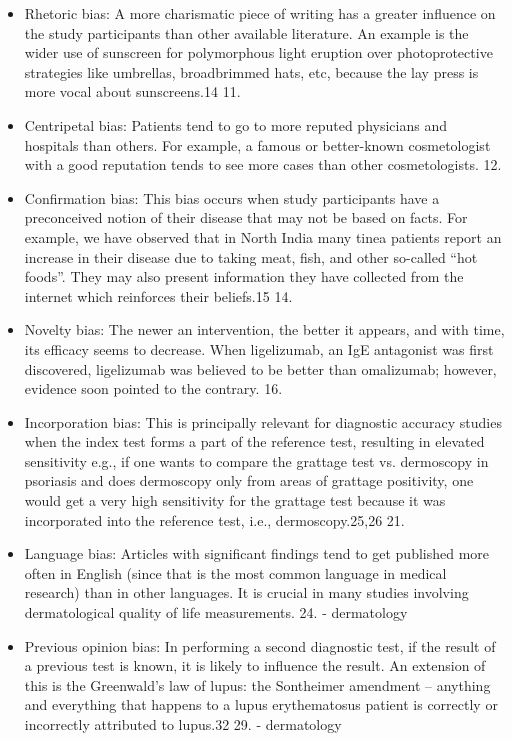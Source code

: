 \documentclass[12pt, a4paper, oneside]{book}   	%
\begin{document}
\begin{itemize}
				\item Rhetoric bias: A more charismatic piece of writing has a greater influence on the study participants than other available literature. An example is the wider use of sunscreen for polymorphous light eruption over photoprotective strategies like umbrellas, broadbrimmed hats, etc, because the lay press is more vocal about sunscreens.14 11. \autocite{Chakraborty_2024}
				\item Centripetal bias: Patients tend to go to more reputed physicians and hospitals than others. For example, a famous or better-known cosmetologist with a good reputation tends to see more cases than other cosmetologists. 12.\autocite{Chakraborty_2024}
				\item  Confirmation bias: This bias occurs when study participants have a preconceived notion of their disease that may not be based on facts. For example, we have observed that in North India many tinea patients report an increase in their disease due to taking meat, fish, and other so-called “hot foods”. They may also present information they have collected from the internet which reinforces their beliefs.15 14.\autocite{Chakraborty_2024}
				\item  Novelty bias: The newer an intervention, the better it appears, and with time, its efficacy seems to decrease. When ligelizumab, an IgE antagonist was first discovered, ligelizumab was believed to be better than omalizumab; however, evidence soon pointed to the contrary. 16.\autocite{Chakraborty_2024}
				\item  Incorporation bias: This is principally relevant for diagnostic accuracy studies when the index test forms a part of the reference test, resulting in elevated sensitivity e.g., if one wants to compare the grattage test vs. dermoscopy in psoriasis and does dermoscopy only from areas of grattage positivity, one would get a very high sensitivity for the grattage test because it was incorporated into the reference test, i.e., dermoscopy.25,26 21.\autocite{Chakraborty_2024}
				\item Language bias: Articles with significant findings tend to get published more often in English (since that is the most common language in medical research) than in other languages. It is crucial in many studies involving dermatological quality of life measurements. 24.\autocite{Chakraborty_2024} - dermatology
			
				\item  Previous opinion bias: In performing a second diagnostic test, if the result of a previous test is known, it is likely to influence the result. An extension of this is the Greenwald’s law of lupus: the Sontheimer amendment – anything and everything that happens to a lupus erythematosus patient is correctly or incorrectly attributed to lupus.32 29. \autocite{Chakraborty_2024} - dermatology
		

\end{itemize}
\end{document}
